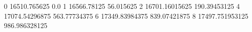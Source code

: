 0 16510.765625 0.0
1 16566.78125 56.015625
2 16701.16015625 190.39453125
4 17074.54296875 563.77734375
6 17349.83984375 839.07421875
8 17497.751953125 986.986328125
